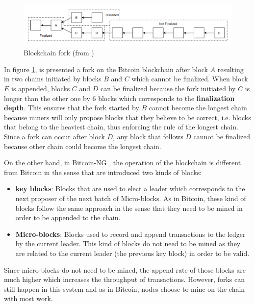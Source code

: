 \begin{figure}[h]
    \centering
    \includegraphics[scale=0.4]{Chapters/Figures/blockchain-fork.png}
    \caption{Blockchain fork (from \cite{blockmess})}
    \label{fig:blockchain-fork}
\end{figure}

In figure \ref{fig:blockchain-fork}, is presented a fork on the Bitcoin blockchain after block $A$ resulting in two chains initiated by blocks $B$ and $C$ which cannot be finalized. When block $E$ is appended, blocks $C$ and $D$ can be finalized because the fork initiated by $C$ is longer than the other one by 6 blocks which corresponds to the \textbf{finalization depth}. This ensures that the fork started by $B$ cannot become the longest chain because miners will only propose blocks that they believe to be correct, i.e. blocks that belong to the heaviest chain, thus enforcing the rule of the longest chain. Since a fork can occur after block $D$, any block that follows $D$ cannot be finalized because other chain could become the longest chain.

On the other hand, in Bitcoin-NG \cite{bitcoin-ng}, the operation of the blockchain is different from Bitcoin in the sense that are introduced two kinds of blocks:
\begin{itemize}
    \item \textbf{key blocks}: Blocks that are used to elect a leader which corresponds to the next proposer of the next batch of Micro-blocks. As in Bitcoin, these kind of blocks follow the same approach in the sense that they need to be mined in order to be appended to the chain.
    \item \textbf{Micro-blocks}: Blocks used to record and append transactions to the ledger by the current leader. This kind of blocks do not need to be mined as they are related to the current leader (the previous key block) in order to be valid.
\end{itemize}

Since micro-blocks do not need to be mined, the append rate of those blocks are much higher which increases the throughput of transactions. However, forks can still happen in this system and as in Bitcoin, nodes choose to mine on the chain with most work.

